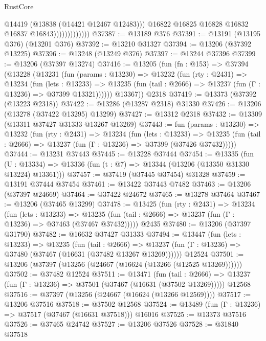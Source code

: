 \begin{lexlean}{RustCore}
\begin{coremodule}
                                @14419
                                (@13838 (@14421 @12467 @12483)))
                              @16822
                              @16825
                              @16828
                              @16832
                              @16837
                              @16843)))))))))))))
@37387 := @13189 @376
@37391 := @13191 (@13195 @376) (@13201 @376)
@37392 := @13210 @31327
@37394 := @13206 (@37392 @13225)
@37396 := @13248 (@13249 @376)
@37397 := @13244 @37396
@37399 := @13206 (@37397 @13274)
@37416 := @13205
    (fun (fn : @153) =>
    @37394
      (@13228
        (@13231
          (fun (params : @13230) =>
          @13232
            (fun (rty : @2431) =>
            @13234
              (fun (lets : @13233) =>
              @13235 (fun (tail : @2666) => @13237 (fun (Γ : @13236) => @37399 @13321))))))
        @13367))
    @2318
@37419 := @13373 (@37392 (@13223 @2318))
@37422 := @13286 (@13287 @2318) @31330
@37426 := @13206 (@13278 (@37422 @13295) @13299)
@37427 := @13312 @2318
@37432 := @13309 (@13311 @37427 @31333 @13267 @13269)
@37443 := fun (params : @13230) =>
  @13232
    (fun (rty : @2431) =>
    @13234
      (fun (lets : @13233) =>
      @13235 (fun (tail : @2666) => @13237 (fun (Γ : @13236) => @37399 (@37426 @37432)))))
@37444 := @13231 @37443
@37445 := @13228 @37444
@37454 := @13335
    (fun (U : @13334) => @13336 (fun (t : @7) => @13344 (@13206 (@13350 @31330 @13224) @13361)))
@37457 := @37419 (@37445 @37454) @31328
@37459 := @13191 @37444 @37454
@37461 := @13422 @37443 @7482
@37463 := @13206 (@37397 @24669)
@37464 := @37422 @24672
@37465 := @13278 @37464
@37467 := @13206 (@37465 @13299)
@37478 := @13425
    (fun (rty : @2431) =>
    @13234
      (fun (lets : @13233) =>
      @13235 (fun (tail : @2666) => @13237 (fun (Γ : @13236) => @37463 (@37467 @37432)))))
    @2435
@37480 := @13206 (@37397 @31790)
@37482 := @16632 @37427 @31333
@37494 := @13447
    (fun (lets : @13233) =>
    @13235
      (fun (tail : @2666) =>
      @13237 (fun (Γ : @13236) => @37480 (@37467 (@16631 (@37482 @13267 @13269))))))
    @12524
@37501 := @13206 (@37397 (@13256 (@24667 (@16624 (@13266 (@12525 @13269))))))
@37502 := @37482 @12524
@37511 := @13471
    (fun (tail : @2666) => @13237 (fun (Γ : @13236) => @37501 (@37467 (@16631 (@37502 @13269)))))
    @12568
@37516 := @37397 (@13256 (@24667 (@16624 (@13266 @12569))))
@37517 := @13206 @37516
@37518 := @37502 @12568
@37524 := @13489 (fun (Γ : @13236) => @37517 (@37467 (@16631 @37518))) @16016
@37525 := @13373 @37516
@37526 := @37465 @24742
@37527 := @13206 @37526
@37528 := @31840 @37518

\end{coremodule}
\end{lexlean}
